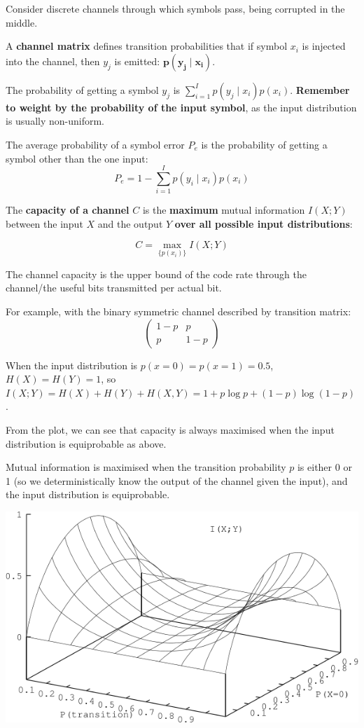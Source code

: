 \documentclass[a4paper, 11pt]{article}
\begin{document}
{
    Consider discrete channels through which symbols pass, being corrupted in the middle.

    A \textbf{channel matrix} defines transition probabilities that if symbol \(x_i\) is injected into the channel, then \(y_j\) is emitted: \(\bm{p(y_j \mid x_i)}\).

    The probability of getting a symbol \(y_j\) is \(\displaystyle \sum_{i=1}^I{p(y_j \mid x_i)p(x_i)}\). \textbf{Remember to weight by the probability of the input symbol}, as the input distribution is usually non-uniform.

    The average probability of a symbol error \(P_e\) is the probability of getting a symbol other than the one input:
    \[P_e = 1 - \sum_{i=1}^I{p(y_i \mid x_i)p(x_i)}\]

    The \textbf{capacity of a channel} \(C\) is the \textbf{maximum} mutual information \(I(X;Y)\) between the input \(X\) and the output \(Y\) \textbf{over all possible input distributions}:

    \[C = \max_{\{p(x_i)\}}{I(X;Y)}\]

    The channel capacity is the upper bound of the code rate through the channel/the useful bits transmitted per actual bit.

    \begin{minipage}[t]{0.6\textwidth}
    For example, with the binary symmetric channel described by transition matrix:
    \[
    \begin{pmatrix}
    1 - p & p \\
    p & 1 - p
    \end{pmatrix}
    \]

    When the input distribution is \(p(x=0) = p(x=1) = 0.5\), \(H(X) = H(Y) = 1\), so \(I(X;Y) = H(X) + H(Y) + H(X,Y) = 1 + p\log p + (1-p)\log(1-p)\).

    From the plot, we can see that capacity is always maximised when the input distribution is equiprobable as above.

    Mutual information is maximised when the transition probability \(p\) is either 0 or 1 (so we deterministically know the output of the channel given the input), and the input distribution is equiprobable.
    \end{minipage}
    \begin{minipage}[t]{0.35\textwidth}
    \vspace{0pt}
    \centering
    \includegraphics[width=\textwidth]{symmetric-channel.png}
    \end{minipage}
}
\end{document}
